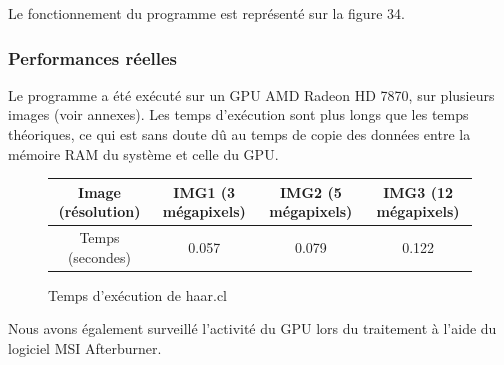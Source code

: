 Le fonctionnement du programme est représenté sur la figure 34.

\subsubsection{Performances réelles}

Le programme a été exécuté sur un GPU AMD Radeon HD 7870, sur plusieurs images (voir annexes). Les temps d'exécution sont plus longs que les temps théoriques, ce qui est sans doute dû au temps de copie des données entre la mémoire RAM du système et celle du GPU.

\begin{figure}[!h]
\begin{center}
\begin{tabular}{|c|c|c|c|}
\hline
Image (résolution) & IMG1 (3 mégapixels)   & IMG2 (5 mégapixels)   &   IMG3 (12 mégapixels)   \\ 
\hline
Temps (secondes) & 0.057  & 0.079   &   0.122 \\
\hline
\end{tabular}
\end{center}
\caption{Temps d'exécution de haar.cl}
\label{tab7}
\end{figure}

Nous avons également surveillé l'activité du GPU lors du traitement à l'aide du logiciel MSI Afterburner. 

